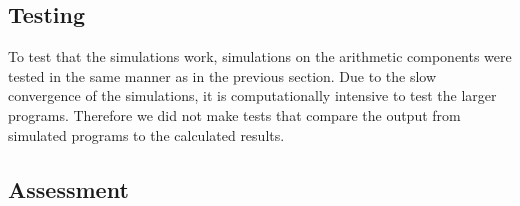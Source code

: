 \subsection{Testing}
To test that the simulations work, simulations on the arithmetic components were tested in the same manner as in the previous section. Due to the slow convergence of the simulations, it is computationally intensive to test the larger programs. Therefore we did not make tests that compare the output from simulated programs to the calculated results. 

\subsection{Assessment}